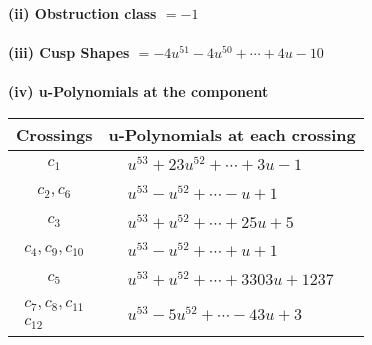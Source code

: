 \documentclass[1p]{elsarticle_modified}
\theoremstyle{definition}
\begin{document}
\flushleft \textbf{(ii) Obstruction class $= -1$}\\~\\
\flushleft \textbf{(iii) Cusp Shapes $= -4 u^{51}-4 u^{50}+\cdots+4 u-10$}\\~\\
\newpage\renewcommand{\arraystretch}{1}
\flushleft \textbf{(iv) u-Polynomials at the component}\newline \\
\begin{tabular}{m{50pt}|m{274pt}}
Crossings & \hspace{64pt}u-Polynomials at each crossing \\
\hline $$\begin{aligned}c_{1}\end{aligned}$$&$\begin{aligned}
&u^{53}+23 u^{52}+\cdots+3 u-1
\end{aligned}$\\
\hline $$\begin{aligned}c_{2},c_{6}\end{aligned}$$&$\begin{aligned}
&u^{53}- u^{52}+\cdots- u+1
\end{aligned}$\\
\hline $$\begin{aligned}c_{3}\end{aligned}$$&$\begin{aligned}
&u^{53}+u^{52}+\cdots+25 u+5
\end{aligned}$\\
\hline $$\begin{aligned}c_{4},c_{9},c_{10}\end{aligned}$$&$\begin{aligned}
&u^{53}- u^{52}+\cdots+u+1
\end{aligned}$\\
\hline $$\begin{aligned}c_{5}\end{aligned}$$&$\begin{aligned}
&u^{53}+u^{52}+\cdots+3303 u+1237
\end{aligned}$\\
\hline $$\begin{aligned}c_{7},c_{8},c_{11}\\c_{12}\end{aligned}$$&$\begin{aligned}
&u^{53}-5 u^{52}+\cdots-43 u+3
\end{aligned}$\\
\hline
\end{tabular}\\~\\
\end{document}
